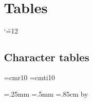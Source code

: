 \documentclass{book}
\begin{document}
%
\chapter{Tables}

\catcode`\"=12

\leavevmode\hbox{}\vfill\hbox{}
\pagebreak

\section{Character tables}
\label{sec:asciitable}
\hbox{}\vskip-20pt \hbox{}

\def\titlefont{\SansSerif \pointSize:10 \Style:roman }
\def\titlefont{\sffamily}
\def\bitfont{\SerifFont \pointSize:7 \Style:Roman }
\def\bitfont{\sffamily\small}
\def\codefont{\SansSerif \pointSize:5 \Style:roman }
\def\codefont{\sffamily\tiny}
\def\namefont{\SansSerif \pointSize:11 \Style:roman }
\let\namefont\relax
\let\commentfont\titlefont
\font\cmtenrm=cmr10 \font\cmtenit=cmti10

\newdimen\thinlinewidth \thinlinewidth=.25mm
\newdimen\fatlinewidth \fatlinewidth=.5mm
\newdimen\rowheight \rowheight=.85cm %
\newdimen\colwidth  \colwidth=1.2cm %
\newdimen\Colwidth {}\colwidth
  \advance\Colwidth by \thinlinewidth
\newdimen\topwhite \topwhite=2pt
\newdimen\botwhite \botwhite=3pt
\newdimen\leftwhite \leftwhite=0pt %
\newdimen\rightwhite \rightwhite=1pt %
\newcount\rowcount 
\newcount\colcount 
{} %
\newcount\thenumber
\end{document}
